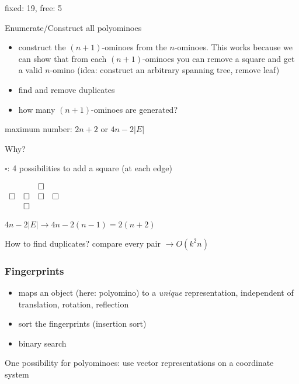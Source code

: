 \documentclass[11pt]{article}
\begin{document}
\begin{itemize}
	fixed: 19, free: 5

\end{itemize}


Enumerate/Construct all polyominoes
\begin{itemize}
\item construct the $ (n + 1) $-ominoes from the $ n $-ominoes. This works because we can show that from each $ (n + 1) $-ominoes you can remove a square and get a valid $ n $-omino (idea: construct an arbitrary spanning tree, remove leaf)
\item find and remove duplicates
\item how many $ (n + 1) $-ominoes are generated?
\end{itemize}

	maximum number:
	$ 2n + 2 $ or $ 4n - 2  | E | $
	
	Why?
	
	$ \square $: 4 possibilities to add a square (at each edge)
	
	$\begin{array}{c c c c}
	& & \square \\
	\square & \square & \square & \square \\
	& \square
	\end{array} $
	
	$ 4n - 2 | E | \rightarrow 4n - 2(n - 1) = 2(n + 2) $
	
	How to find duplicates? compare every pair $ \rightarrow O(k^2 n) $

\subsubsection{Fingerprints}

\begin{itemize}

\item maps an object (here: polyomino) to a \textit{unique} representation, independent of translation, rotation, reflection

\item sort the fingerprints (insertion sort)

\item binary search

\end{itemize}

One possibility for polyominoes: use vector representations on a coordinate system \newline
\end{document}
